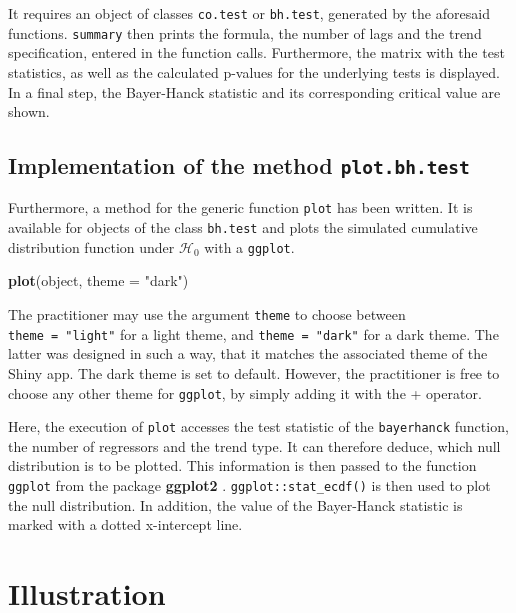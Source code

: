 \documentclass[11pt,a4paper]{article}
\newenvironment{Shaded}{\begin{snugshade}}{\end{snugshade}}
\newcommand{\DataTypeTok}[1]{\textcolor[rgb]{0.13,0.29,0.53}{#1}}
\newcommand{\KeywordTok}[1]{\textcolor[rgb]{0.13,0.29,0.53}{\textbf{#1}}}
\newcommand{\NormalTok}[1]{#1}
\newcommand{\StringTok}[1]{\textcolor[rgb]{0.31,0.60,0.02}{#1}}
\begin{document}
It requires an object of classes \texttt{co.test} or \texttt{bh.test},
generated by the aforesaid functions. \texttt{summary} then prints the
formula, the number of lags and the trend specification, entered in the
function calls. Furthermore, the matrix with the test statistics, as
well as the calculated p-values for the underlying tests is displayed.
In a final step, the Bayer-Hanck statistic and its corresponding
critical value are shown.

\hypertarget{implementation-of-the-method-plot.bh.test}{%
\subsection{\texorpdfstring{Implementation of the method
\texttt{plot.bh.test}}{Implementation of the method plot.bh.test}}\label{implementation-of-the-method-plot.bh.test}}

Furthermore, a method for the generic function \texttt{plot} has been
written. It is available for objects of the class \texttt{bh.test} and
plots the simulated cumulative distribution function under
\(\mathcal{H}_0\) with a \texttt{ggplot}.

\begin{Shaded}
\begin{Highlighting}[]
\KeywordTok{plot}\NormalTok{(object, }\DataTypeTok{theme =} \StringTok{"dark"}\NormalTok{)}
\end{Highlighting}
\end{Shaded}

The practitioner may use the argument \texttt{theme} to choose between
\texttt{theme\ =\ "light"} for a light theme, and
\texttt{theme\ =\ "dark"} for a dark theme. The latter was designed in
such a way, that it matches the associated theme of the Shiny app. The
dark theme is set to default. However, the practitioner is free to
choose any other theme for \texttt{ggplot}, by simply adding it with the
+ operator.

Here, the execution of \texttt{plot} accesses the test statistic of the
\texttt{bayerhanck} function, the number of regressors and the trend
type. It can therefore deduce, which null distribution is to be plotted.
This information is then passed to the function \texttt{ggplot} from the
package \textbf{ggplot2} \autocite{wickham_ggplot2_2020}.
\texttt{ggplot::stat\_ecdf()} is then used to plot the null
distribution. In addition, the value of the Bayer-Hanck statistic is
marked with a dotted x-intercept line.

\hypertarget{illustration}{%
\section{Illustration}\label{illustration}}
\end{document}
